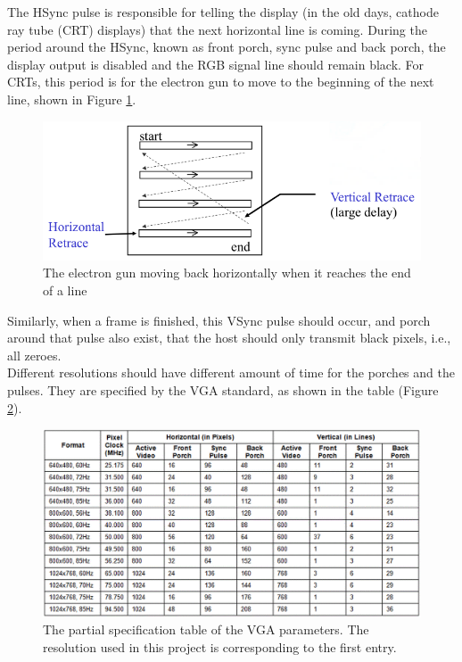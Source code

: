 \documentclass{article}
\begin{document}
	The HSync pulse is responsible for telling the display (in the old days, cathode ray tube (CRT) displays) that the next horizontal line is coming. During the period around the HSync, known as front porch, sync pulse and back porch, the display output is disabled and the RGB signal line should remain black. For CRTs, this period is for the electron gun to move to the beginning of the next line, shown in Figure \ref{fig:scanline}.
	\begin{figure}[h]
		\centering
		\includegraphics[scale=0.78]{scanline}
		\caption{The electron gun moving back horizontally when it reaches the end of a line}
		\label{fig:scanline}
	\end{figure}
	Similarly, when a frame is finished, this VSync pulse should occur, and porch around that pulse also exist, that the host should only transmit black pixels, i.e., all zeroes.
	\\
		
		Different resolutions should have different amount of time for the porches and the pulses. They are specified by the VGA standard, as shown in the table (Figure \ref{fig:vgatiming}).
	\begin{figure}[h]
		\centering
		\includegraphics[scale=0.5]{vgatiming}
		\caption{The partial specification table of the VGA parameters. The resolution used in this project is corresponding to the first entry.}
		\label{fig:vgatiming}
	\end{figure}
	\\
		
\end{document}
